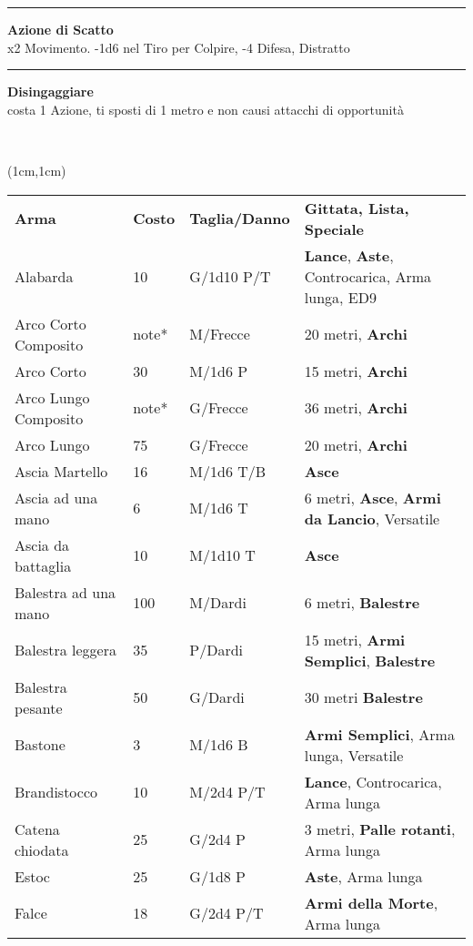\documentclass[a4paper,12 pt,openany]{book}
\newcommand{\riga}{\rule{\textwidth}{0.4pt}}
\begin{document}
\begin{textblock*}{6.2cm}
\riga

\textbf{Azione di Scatto}\\
x2 Movimento. -1d6 nel Tiro per Colpire, -4 Difesa, Distratto

\riga

\textbf{Disingaggiare}\\
costa 1 Azione, ti sposti di 1 metro e non causi attacchi di opportunità

\end{textblock*}



~\newpage

\begin{textblock*}{19.5cm}(1cm,1cm) %

\begin{tabularx}{0.95\textwidth}{llll}
\textbf{Arma}&\textbf{Costo}&\textbf{Taglia/Danno} & \textbf{Gittata, Lista, Speciale}\\
Alabarda& 10 & G/1d10 P/T& \textbf{Lance}, \textbf{Aste}, Controcarica, Arma lunga, ED9 \\
Arco Corto Composito& note*& M/Frecce& 20 metri, \textbf{Archi}\\
Arco Corto& 30 & M/1d6 P& 15 metri, \textbf{Archi}\\
Arco Lungo Composito& note*& G/Frecce& 36 metri, \textbf{Archi}\\
Arco Lungo& 75 & G/Frecce& 20 metri, \textbf{Archi}\\
Ascia Martello& 16 & M/1d6 T/B& \textbf{Asce}\\
Ascia ad una mano& 6  & M/1d6 T& 6 metri, \textbf{Asce}, \textbf{Armi da Lancio}, Versatile\\
Ascia da battaglia& 10 & M/1d10 T&\textbf{Asce}\\
Balestra ad una mano& 100& M/Dardi& 6 metri, \textbf{Balestre}\\
Balestra leggera& 35 & P/Dardi& 15 metri, \textbf{Armi Semplici}, \textbf{Balestre}\\
Balestra pesante& 50 & G/Dardi& 30 metri \textbf{Balestre}\\
Bastone& 3& M/1d6 B& \textbf{Armi Semplici}, Arma lunga, Versatile\\
Brandistocco& 10 & M/2d4 P/T& \textbf{Lance}, Controcarica, Arma lunga\\
Catena chiodata& 25 & G/2d4 P& 3 metri, \textbf{Palle rotanti}, Arma lunga\\
Estoc& 25& G/1d8 P& \textbf{Aste}, Arma lunga\\
Falce& 18 & G/2d4 P/T& \textbf{Armi della Morte}, Arma lunga\\

\end{tabularx}
\end{textblock*}
\end{document}
